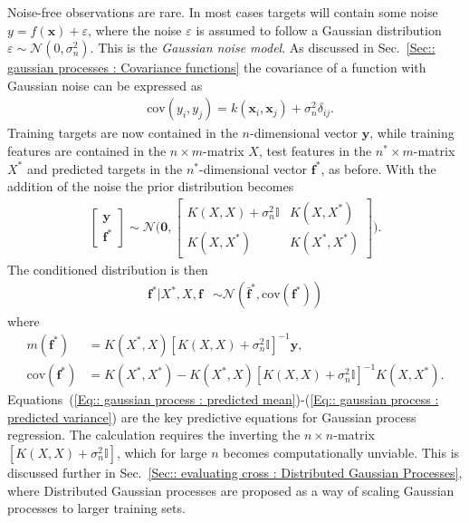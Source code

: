 \documentclass[twoside,english]{uiofysmaster}
\begin{document}
Noise-free observations are rare. In most cases targets will contain some noise $y = f(\textbf{x}) + \varepsilon$, where the noise $\varepsilon$ is assumed to follow a Gaussian distribution $\varepsilon \sim \mathcal{N}(0, \sigma_n^2)$. This is the \textit{Gaussian noise model}. As discussed in Sec.~\ref{Sec:: gaussian processes : Covariance functions} the covariance of a function with Gaussian noise can be expressed as
\begin{align}
&\text{cov}(y_i, y_j) = k(\textbf{x}_i, \textbf{x}_j) + \sigma_n^2 \delta_{ij}.
\end{align}
Training targets are now contained in the $n$-dimensional vector $\textbf{y}$, while training features are contained in the $n \times m$-matrix $X$, test features in the $n^* \times m$-matrix $X^*$ and predicted targets in the $n^*$-dimensional vector $\textbf{f}^*$, as before. With the addition of the noise the prior distribution becomes
\begin{align}
\begin{bmatrix}
\textbf{y}\\
\textbf{f}^*
\end{bmatrix}
\sim 
\mathcal{N} \Bigg(
\boldsymbol{0},
\begin{bmatrix}
K(X, X) + \sigma_n^2 \mathbb{I} & K(X, X^*)\\
K(X, X^*) & K(X^*, X^*)
\end{bmatrix}
 \Bigg).
\end{align}
The conditioned distribution is then 
\begin{align}
\textbf{f}^* \big| X^*, X, \textbf{f} & \sim \mathcal{N}(\bar{\textbf{f}}^*, \text{cov}(\textbf{f}^*))
\end{align}
where
\begin{align}
m(\textbf{f}^*) &= K(X^*, X) [K(X, X) + \sigma_n^2 \mathbb{I}]^{-1} \textbf{y},\label{Eq:: gaussian process : predicted mean}\\ 
\text{cov} (\textbf{f}^*) &= K(X^*, X^*) - K(X^*, X)[K(X, X) + \sigma_n^2 \mathbb{I}]^{-1} K(X, X^*). \label{Eq:: gaussian process : predicted variance}
\end{align}
Equations~(\ref{Eq:: gaussian process : predicted mean})-(\ref{Eq:: gaussian process : predicted variance}) are the key predictive equations for Gaussian process regression. The calculation requires the inverting the $n \times n$-matrix $[K(X,X) + \sigma_n^2 \mathbb{I}]$, which for large $n$ becomes computationally unviable. This is discussed further in Sec.~\ref{Sec:: evaluating cross : Distributed Gaussian Processes}, where Distributed Gaussian processes are proposed as a way of scaling Gaussian processes to larger training sets.
\end{document}
